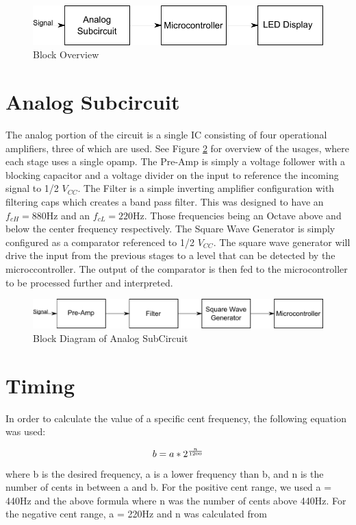 \documentclass[12pt]{article}
\begin{document}
\begin{figure}[H]
\centering
	\includegraphics[width=6in]{"Block Overview"}
	\caption{Block Overview}
	\label{block_overview} 
\end{figure}

\section{Analog Subcircuit}
The analog portion of the circuit is a single IC consisting of four operational amplifiers, three of which are used. See Figure \ref{analog_block} for overview of the usages, where each stage uses a single opamp. The Pre-Amp is simply a voltage follower with a blocking capacitor and a voltage divider on the input to reference the incoming signal to 1/2 $V_{CC}$. The Filter is a simple inverting amplifier configuration with filtering caps which creates a band pass filter. This was designed to have an $f_{cH }= 880 \mbox{Hz}$ and an $f_{cL} = 220 \mbox{Hz}$. Those frequencies being an Octave above and below the center frequency respectively. The Square Wave Generator is simply configured as a comparator referenced to 1/2 $V_{CC}$.  The square wave generator will drive the input from the previous stages to a level that can be detected by the microccontroller. The output of the comparator is then fed to the microcontroller to be processed further and interpreted.

\begin{figure}[H]
\centering
	\includegraphics[width=6in]{"Analog Subcircuit"}
	\caption{Block Diagram of Analog SubCircuit}
	\label{analog_block} 
\end{figure}

\section{Timing}

In order to calculate the value of a specific cent frequency, the following equation was used:

\begin{equation}
b = a * 2^{n \over 1200}
\end{equation}
where b is the desired frequency, a is a lower frequency than b, and n is the number of cents in between
a and b. For the positive cent range, we used a = 440Hz and the above formula where n was the number
of cents above 440Hz. For the negative cent range, a = 220Hz and n was calculated from
\end{document}
